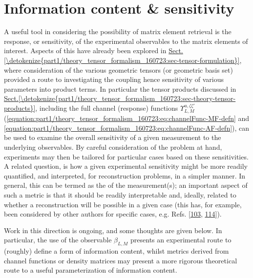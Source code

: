 \documentclass[letterpaper,table,10pt,english]{jupyterBook}
\begin{document}
\section{Information content \& sensitivity}
\label{\detokenize{part1/theory_info_content_221122:information-content-sensitivity}}\label{\detokenize{part1/theory_info_content_221122:sec-info-content}}\label{\detokenize{part1/theory_info_content_221122::doc}}
\sphinxAtStartPar
A useful tool in considering the possibility of matrix element retrieval is the response, or sensitivity, of the experimental observables to the matrix elements of interest. Aspects of this have already been explored in \hyperref[\detokenize{part1/theory_tensor_formalism_160723:sec-tensor-formulation}]{Sect.\@ \ref{\detokenize{part1/theory_tensor_formalism_160723:sec-tensor-formulation}}}, where consideration of the various geometric tensors (or geometric basis set) provided a route to investigating the coupling \sphinxhyphen{} hence sensitivity \sphinxhyphen{} of various parameters into product terms. In particular the tensor products discussed in \hyperref[\detokenize{part1/theory_tensor_formalism_160723:sec-theory-tensor-products}]{Sect.\@ \ref{\detokenize{part1/theory_tensor_formalism_160723:sec-theory-tensor-products}}}, including the full channel (response) functions \(\varUpsilon_{L,M}^{u,\zeta\zeta'}\) (\eqref{equation:part1/theory_tensor_formalism_160723:eq:channelFunc-MF-defn} and \eqref{equation:part1/theory_tensor_formalism_160723:eq:channelFunc-AF-defn}), can be used to examine the overall sensitivity of a given measurement to the underlying observables. By careful consideration of the problem at hand, experiments may then be tailored for particular cases based on these sensitivities. A related question, is how a given experimental sensitivity might be more readily quantified, and interpreted, for reconstruction problems, in a simpler manner. In general, this can be termed as the  of the measurement(s); an important aspect of such a metric is that it should be readily interpretable and, ideally, related to whether a reconstruction will be possible in a given case (this has, for example, been considered by other authors for specific cases, e.g. Refs. {[}\hyperlink{cite.backmatter/bibliography:id815}{103}, \hyperlink{cite.backmatter/bibliography:id850}{114}{]}).

\sphinxAtStartPar
Work in this direction is ongoing, and some thoughts are given below. In particular, the use of the observable \(\beta_{L,M}\) presents an experimental route to (roughly) define a form of information content, whilst metrics derived from channel functions or density matrices may present a more rigorous theoretical route to a useful parameterization of information content.
\end{document}
